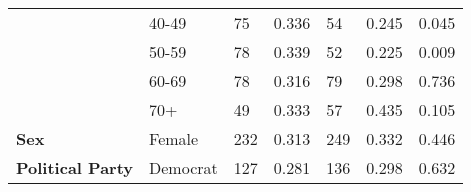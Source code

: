 \begin{tabular}{L{3cm} L{5cm} C{1.5cm} C{2.5cm} C{1.5cm} C{2.5cm} C{3cm}}
                                                          &                          40-49                           &                            75                            &                          0.336                           &                            54                            &                          0.245                           &                          0.045                            \\
                                                          &                          50-59                           &                            78                            &                          0.339                           &                            52                            &                          0.225                           &                          0.009                            \\
                                                          &                          60-69                           &                            78                            &                          0.316                           &                            79                            &                          0.298                           &                          0.736                            \\
                                                          &                           70+                            &                            49                            &                          0.333                           &                            57                            &                          0.435                           &                          0.105                            \\
\textbf{Sex}                                              &                          Female                          &                           232                            &                          0.313                           &                           249                            &                          0.332                           &                          0.446                            \\
\textbf{Political Party}                                  &                         Democrat                         &                           127                            &                          0.281                           &                           136                            &                          0.298                           &                          0.632                            \\

\end{tabular}
